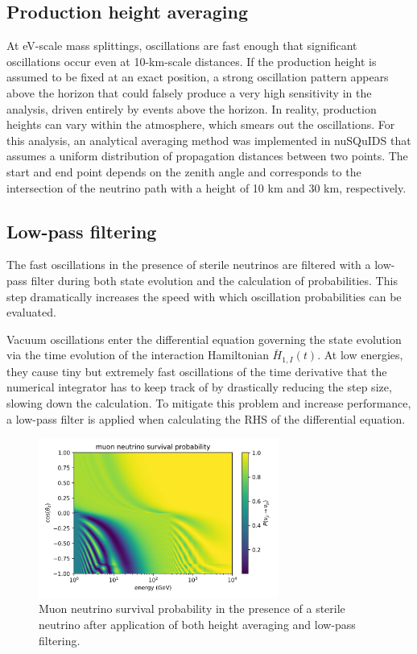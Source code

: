 \subsection{Production height averaging}
At eV-scale mass splittings, oscillations are fast enough that significant oscillations occur even at 10-km-scale distances.
If the production height is assumed to be fixed at an exact position, a strong oscillation pattern appears above the horizon that could falsely produce a very high sensitivity in the analysis, driven entirely by events above the horizon.
In reality, production heights can vary within the atmosphere, which smears out the oscillations.
For this analysis, an analytical averaging method was implemented in nuSQuIDS that assumes a uniform distribution of propagation distances between two points.
The start and end point depends on the zenith angle and corresponds to the intersection of the neutrino path with a height of 10 km and 30 km, respectively.

\subsection{Low-pass filtering}
\label{sec:low-pass-filtering}
The fast oscillations in the presence of sterile neutrinos are filtered with a low-pass filter during both state evolution and the calculation of probabilities.
This step dramatically increases the speed with which oscillation probabilities can be evaluated.

Vacuum oscillations enter the differential equation governing the state evolution via the time evolution of the interaction Hamiltonian $\bar{H}_{1, I}(t)$.
At low energies, they cause tiny but extremely fast oscillations of the time derivative that the numerical integrator has to keep track of by drastically reducing the step size, slowing down the calculation.
To mitigate this problem and increase performance, a low-pass filter is applied when calculating the RHS of the differential equation.

\begin{figure}
    \centering
    \includegraphics[width=0.7\textwidth]{figures/measurement/sterile_analysis/nusquids/Dm41_0.5eV2_th24_15deg_avg_height_10-30km_lp_belowhor.png}
    \caption{Muon neutrino survival probability in the presence of a sterile neutrino after application of both height averaging and low-pass filtering.}
    \label{fig:nusquids-low-pass-filtering}
\end{figure}

